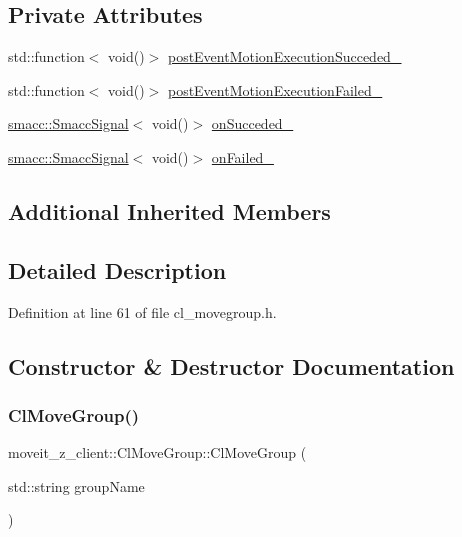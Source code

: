 \subsection*{Private Attributes}
\begin{DoxyCompactItemize}
\item 
std\+::function$<$ void()$>$ \hyperlink{classmoveit__z__client_1_1ClMoveGroup_a9234c0edadb1f173c31fc8fa5430afcd}{post\+Event\+Motion\+Execution\+Succeded\+\_\+}
\item 
std\+::function$<$ void()$>$ \hyperlink{classmoveit__z__client_1_1ClMoveGroup_afecfdc1860dffea3331379b90d608154}{post\+Event\+Motion\+Execution\+Failed\+\_\+}
\item 
\hyperlink{classsmacc_1_1SmaccSignal}{smacc\+::\+Smacc\+Signal}$<$ void()$>$ \hyperlink{classmoveit__z__client_1_1ClMoveGroup_a77804970cc1e2ae64e26dabbf556352d}{on\+Succeded\+\_\+}
\item 
\hyperlink{classsmacc_1_1SmaccSignal}{smacc\+::\+Smacc\+Signal}$<$ void()$>$ \hyperlink{classmoveit__z__client_1_1ClMoveGroup_ab9f19c609cfa111748bc16d497dffe9a}{on\+Failed\+\_\+}
\end{DoxyCompactItemize}
\subsection*{Additional Inherited Members}


\subsection{Detailed Description}


Definition at line 61 of file cl\+\_\+movegroup.\+h.



\subsection{Constructor \& Destructor Documentation}
\mbox{\label{classmoveit__z__client_1_1ClMoveGroup_a6649ba7d3b429d6036a23d11f01ccac9}} 
\subsubsection{\texorpdfstring{Cl\+Move\+Group()}{ClMoveGroup()}}
{\footnotesize\ttfamily moveit\+\_\+z\+\_\+client\+::\+Cl\+Move\+Group\+::\+Cl\+Move\+Group (\begin{DoxyParamCaption}\item[{std\+::string}]{group\+Name }\end{DoxyParamCaption})}



